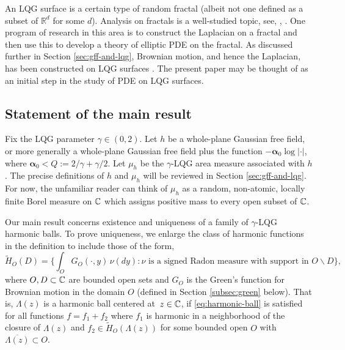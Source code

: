 \documentclass[12pt]{amsart}
\numberwithin{equation}{section}
\begin{document}
	
	An LQG surface is a certain type of random fractal (albeit not one defined as a subset of $\mathbb R^d$ for some $d$). Analysis on fractals is a well-studied topic, see, \eg, \cite{kigami2001analysis, strichartz2006differential, strichartz2020analysis}.
	One program of research in this area is to construct the Laplacian on a fractal and then use this to develop a theory of elliptic PDE on the fractal. 
	As discussed further in Section \ref{sec:gff-and-lqg}, Brownian motion, and hence the Laplacian, has been constructed on LQG surfaces \cite{garban2016liouville, berestycki2015diffusion}.
	The present paper may be thought of as an initial step in the study of PDE on LQG surfaces. 
	
	
	
	
	
	\subsection{Statement of the main result}
	
	
	Fix the LQG parameter $\gamma\in (0,2)$. Let $h$ be a whole-plane Gaussian free field, or more generally a whole-plane Gaussian free field plus the function $-\boldsymbol{\alpha}_0 \log|\cdot|$, where $\boldsymbol{\alpha}_0 < Q := 2/\gamma+\gamma/2$. Let $\mu_h$ be the $\gamma$-LQG area measure associated with $h$.
	The precise definitions of $h$ and $\mu_h$ will be reviewed in Section \ref{sec:gff-and-lqg}.
	For now, the unfamiliar reader can think of $\mu_h$ as a random, non-atomic, locally finite Borel measure on $\mathbb{C}$ which assigns positive
	mass to every open subset of $\mathbb{C}$. 
	
	
	Our main result concerns existence and uniqueness of a family of $\gamma$-LQG harmonic balls. To prove uniqueness, we enlarge the class of harmonic functions in the definition to include those of the form,
	\begin{equation} \label{eq:harmonic-fns}
	\tilde H_O(D) = \{ \int_O G_O(\cdot,y) \,\nu(dy) : \mbox{$\nu$ is a signed Radon measure with support in $O \backslash D$}\},
	\end{equation}
	where $O, D \subset \mathbb{C}$ are bounded open sets and $G_O$ is the Green's function for Brownian motion in the domain $O$
	(defined in Section \ref{subsec:green} below). 
	That is, $\Lambda(z)$ is a harmonic ball centered at~$z \in \mathbb{C}$, if \eqref{eq:harmonic-ball} is
	satisfied for all functions $f = f_1 + f_2$ where $f_1$ is harmonic in a neighborhood of the closure of $\Lambda(z)$
	and $f_2 \in \tilde H_O(\Lambda(z))$ for some bounded open $O$ with~$\overline{\Lambda(z)} \subset O$. %
	
\end{document}
